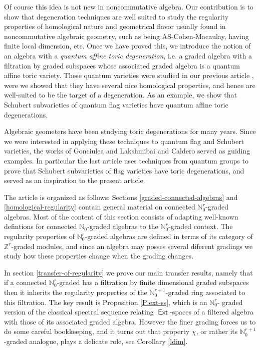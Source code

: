 \documentclass[11pt,fleqn]{article}
\newcommand\NN{\mathbb N}
\newcommand\ZZ{\mathbb Z}
\DeclareMathOperator\Ext{\mathsf{Ext}}
\begin{document}
Of course this idea is not new in noncommutative algebra. Our contribution is to show
that degeneration techniques are well suited to study the regularity properties of
homological nature and geometrical flavor usually found in noncommutative algebraic 
geometry, such as being AS-Cohen-Macaulay, having finite local dimension, etc. Once
we have proved this, we introduce the notion of an algebra with a \emph{quantum affine 
toric degeneration}, i.e. a graded algebra with a filtration by graded subspaces whose
associated graded algebra is a quantum affine toric variety. These quantum varieties 
were studied in our previous article \cite{RZ2}, were we showed that they have several
nice homological properties, and hence are well-suited to be the target of a 
degeneration. As an example, we show that Schubert subvarieties of quantum flag varieties
have quantum affine toric degenerations.

Algebraic geometers have been studying toric degenerations for many years. Since we 
were interested in applying these techniques to quantum flag and Schubert varieties, the 
works of Gonciulea and Lakshmibai \cite{GL} and Caldero \cite{C} served as guiding 
examples. In particular the last article uses techniques from quantum groups to prove 
that Schubert subvarieties of flag varieties have toric degenerations, and served as an 
inspiration to the present article.

\bigskip

The article is organized as follows: Sections \ref{graded-connected-algebras} and 
\ref{homological-regularity} contain general material on connected $\NN_0^r$-graded 
algebras. Most of the content of this section consists of adapting 
well-known defintions for connected $\NN_0$-graded algebras to the $\NN_0^r$-graded 
context. The regularity properties of $\NN_0^r$-graded algebras are defined in terms of 
its category of $\ZZ^r$-graded modules, and since an algebra may posses several diferent 
gradings we study how these properties change when the grading changes.

In section \ref{transfer-of-regularity} we prove our main transfer results, namely that
if a connected $\NN_0^r$-graded has a filtration by finite dimensional graded subspaces 
then it inherits the regularity properties of the $\NN_0^{r+1}$-graded ring associated to
this filtration. The key result is Proposition \ref{P:ext-ss}, which is an $\NN_0^r$-
graded version of the classical spectral sequence relating $\Ext$-spaces of a filtered
algebra with those of its associated graded algebra. However the finer grading forces 
us to do some careful bookkeeping, and it turns out that property $\chi$, or rather its 
$\NN_0^{r+1}$-graded analogue, plays a delicate role, see Corollary \ref{ldim}.
\end{document}
